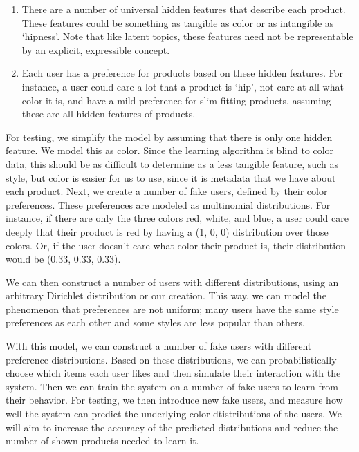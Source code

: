 \documentclass[10pt]{article}
\begin{document}
\begin{enumerate}
\item There are a number of universal hidden features that describe each product.
These features could be something as tangible as color or as intangible as
`hipness'. Note that like latent topics, these features need not be
representable by an explicit, expressible concept.

\item Each user has a preference for products based on these hidden features. For
instance, a user could care a lot that a product is `hip', not care
at all what color it is, and have a mild preference for slim-fitting products,
assuming these are all hidden features of products.
\end{enumerate}

For testing, we simplify the model by assuming that there is only one hidden
feature. We model this as color. Since the learning algorithm is blind to color
data, this should be as difficult to determine as a less tangible feature, such
as style, but color is easier for us to use, since it is metadata that we
have about each product. Next, we create a number of fake users, defined by their color
preferences. These preferences are modeled as multinomial distributions. For instance, if
there are only the three colors red, white, and blue, a user could care deeply
that their product is red by having a (1, 0, 0) distribution over those colors.
Or, if the user doesn't care what color their product is, their distribution
would be (0.33, 0.33, 0.33). 

We can then construct a number of users with different distributions, using an
arbitrary Dirichlet distribution or our creation. This way, we can model the
phenomenon that preferences are not uniform; many users have the same style
preferences as each other and some styles are less popular than others.

With this model, we can construct a number of fake users with different
preference distributions. Based on these distributions, we can
probabilistically choose which items each user likes and then simulate their
interaction with the system. Then we can train the system on a number of fake
users to learn from their behavior. For testing, we then introduce new fake users,
and measure how well the system can predict the underlying color dtistributions of
the users. We will aim to increase the accuracy of the predicted distributions and
reduce the number of shown products needed to learn it.
\end{document}
